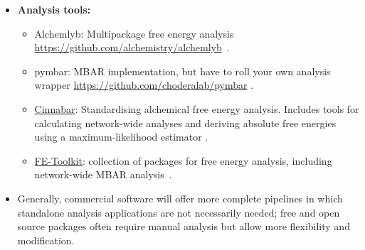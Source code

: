 \documentclass[9pt,bestpractices]{livecoms}
\begin{document}
\begin{itemize}
\begin{itemize}
    \item \href{https://github.com/OpenBioSim/ghostly}{Ghostly} is as a standalone tool to programmatically implement the dummy atom modifications discussed in \citeauthor{Fleck_2021}~\cite{Fleck_2021} for a range of file formats.
    \item \href{https://github.com/OpenFreeEnergy/kartograf}
    {Kartograf}: An geometry-based atom mapper for setting up relative free energies with a conserved core~\cite{ries2024kartograf}.
    \item \href{https://github.com/OpenFreeEnergy/Konnektor}
    {Konnektor}: Tooling to aid in the creation of alchemical perrturbation networks~\cite{ries2024konnektor}. 
    \item \href{https://github.com/OpenFreeEnergy/Lomap}{Lomap/Lomap2} : Relative alchemical transformation graph planning for setting up perturbation networks~\cite{liu2013lead}.
	\item \href{http://pmx.mpibpc.mpg.de/instructions.html}{PMX}: Setup of perturbation maps, perturbed topologies and input coordinates for GROMACS simulations at \url{https://github.com/deGrootLab/pmx}.
	\item \href{https://github.com/qusers/qligfep}{QligFEP} offers robust and fast setup of FEP calculations for the software package Q~\cite{jespers2019qligfep}.
    \href{https://github.com/cbc-univie/transformato}{transformato} is a package for setting up single topology alchemical transformations to be run using CHARMM or OpenMM \cite{karwounopoulos2022relative, karwounopoulos2023calculations, wieder2022alchemical}.
	\end{itemize}
\item []\textbf{Analysis tools:}
	\begin{itemize}

	\item Alchemlyb: Multipackage free energy analysis
	\url{https://github.com/alchemistry/alchemlyb}~\cite{daviddotson2020alchemistry}.
	\item pymbar: MBAR implementation, but have to roll your own analysis wrapper      
	\url{https://github.com/choderalab/pymbar} \cite{shirts2008statisticallya}.
	\item \href{https://github.com/OpenFreeEnergy/cinnabar}{Cinnabar}: Standardising alchemical free energy analysis. Includes tools for calculating network-wide analyses and deriving absolute free energies using a maximum-likelihood estimator \cite{richard_gowers_2025_15678719}.
    \item \href{https://gitlab.com/RutgersLBSR/fe-toolkit}{FE-Toolkit}: collection of packages for free energy analysis, including network-wide MBAR analysis~\cite{giese2025fe}.
	\end{itemize}
\item[] Generally, commercial software will offer more complete pipelines in which standalone analysis applications are not necessarily needed; free and open source packages often require manual analysis but allow more flexibility and modification.
\end{itemize}
\end{document}
